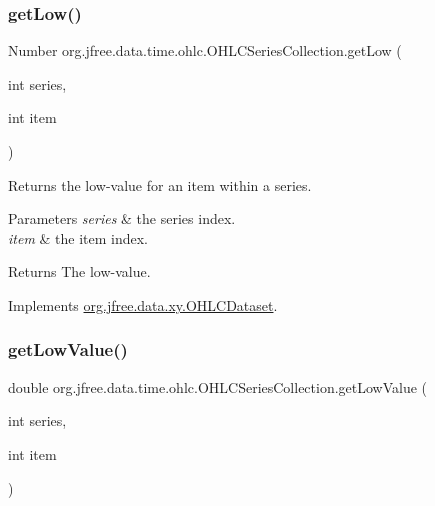 \subsubsection{\texorpdfstring{get\+Low()}{getLow()}}
{\footnotesize\ttfamily Number org.\+jfree.\+data.\+time.\+ohlc.\+O\+H\+L\+C\+Series\+Collection.\+get\+Low (\begin{DoxyParamCaption}\item[{int}]{series,  }\item[{int}]{item }\end{DoxyParamCaption})}

Returns the low-\/value for an item within a series.


\begin{DoxyParams}{Parameters}
{\em series} & the series index. \\
\hline
{\em item} & the item index.\\
\hline
\end{DoxyParams}
\begin{DoxyReturn}{Returns}
The low-\/value. 
\end{DoxyReturn}


Implements \mbox{\hyperlink{interfaceorg_1_1jfree_1_1data_1_1xy_1_1_o_h_l_c_dataset_a87d7730829e66f23a2601c3519cf828a}{org.\+jfree.\+data.\+xy.\+O\+H\+L\+C\+Dataset}}.

\mbox{\label{classorg_1_1jfree_1_1data_1_1time_1_1ohlc_1_1_o_h_l_c_series_collection_a23473c76cc9364c1b6a646014eab2423}} 
\subsubsection{\texorpdfstring{get\+Low\+Value()}{getLowValue()}}
{\footnotesize\ttfamily double org.\+jfree.\+data.\+time.\+ohlc.\+O\+H\+L\+C\+Series\+Collection.\+get\+Low\+Value (\begin{DoxyParamCaption}\item[{int}]{series,  }\item[{int}]{item }\end{DoxyParamCaption})}

